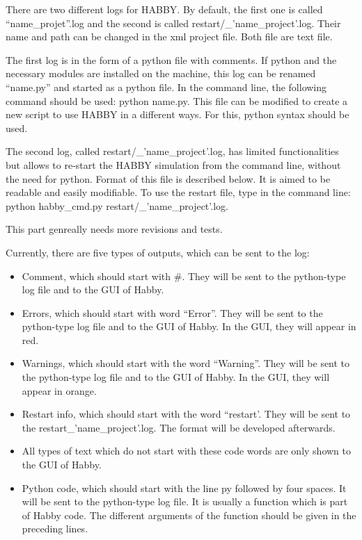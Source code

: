\documentclass[letterpaper,10pt,english]{sphinxmanual}
\begin{document}
There are two different logs for HABBY. By default, the first one is called “name\_projet”.log and
the second is called restart/\_'name\_project'.log. Their name and path can be changed in the xml
project file. Both file are text file.

The first log is in the form of a python file with comments. If python and the necessary modules
are installed on the machine, this log can be renamed “name.py” and started as a python file.
In the command line, the following command should be used: python name.py. This file can be
modified to create a new script to use HABBY in a different ways. For this, python syntax should be used.

The second log, called restart/\_’name\_project’.log, has limited functionalities but allows to
re-start the HABBY simulation from the command line, without the need for python.
Format of this file is described below. It is aimed to be readable and easily modifiable.
To use the restart file, type in the command line: python habby\_cmd.py restart/\_’name\_project’.log.

This part genreally needs more revisions and tests.


Currently, there are five types of outputs, which can be sent to the log:
\begin{itemize}
\item {} 
Comment, which should start with \#. They will be sent to the python-type log file and to the GUI of Habby.

\item {} 
Errors, which should start with word “Error”. They will be sent to the python-type log file and to the GUI of Habby. In the GUI, they will appear in red.

\item {} 
Warnings, which should start with the word “Warning”. They will be sent to the python-type log file and to the GUI of Habby. In the GUI, they will appear in orange.

\item {} 
Restart info, which should start with the word “restart’. They will be sent to the restart\_’name\_project’.log. The format will be developed afterwards.

\item {} 
All types of text which do not start with these code words are only shown to the GUI of Habby.

\item {} 
Python code, which should start with the line py followed by four spaces.  It will be sent to the python-type log file. It is usually a function which is part of Habby code. The different arguments of the function should be given in the preceding lines.

\end{itemize}
\end{document}
